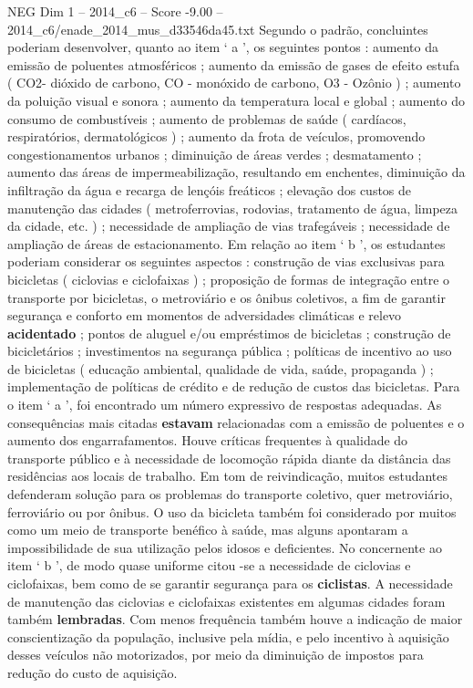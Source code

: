 \begin{textsample}{NEG Dim 1 – 2014\_c6 – Score -9.00 – 2014\_c6/enade\_2014\_mus\_d33546da45.txt}
Segundo o padrão, concluintes poderiam desenvolver, quanto ao item ‘ a ’, os seguintes pontos : aumento da emissão de poluentes atmosféricos ; aumento da emissão de gases de efeito estufa ( CO2- dióxido de carbono, CO - monóxido de carbono, O3 - Ozônio ) ; aumento da poluição visual e sonora ; aumento da temperatura local e global ; aumento do consumo de combustíveis ; aumento de problemas de saúde ( cardíacos, respiratórios, dermatológicos ) ; aumento da frota de veículos, promovendo congestionamentos urbanos ; diminuição de áreas verdes ; desmatamento ; aumento das áreas de impermeabilização, resultando em enchentes, diminuição da infiltração da água e recarga de lençóis freáticos ; elevação dos custos de manutenção das cidades ( metroferrovias, rodovias, tratamento de água, limpeza da cidade, etc. ) ; necessidade de ampliação de vias trafegáveis ; necessidade de ampliação de áreas de estacionamento.
Em relação ao item ‘ b ’, os estudantes poderiam considerar os seguintes aspectos : construção de vias exclusivas para bicicletas ( ciclovias e ciclofaixas ) ; proposição de formas de integração entre o transporte por bicicletas, o metroviário e os ônibus coletivos, a fim de garantir segurança e conforto em momentos de adversidades climáticas e relevo \textbf{acidentado} ; pontos de aluguel e/ou empréstimos de bicicletas ; construção de bicicletários ; investimentos na segurança pública ; políticas de incentivo ao uso de bicicletas ( educação ambiental, qualidade de vida, saúde, propaganda ) ; implementação de políticas de crédito e de redução de custos das bicicletas.
Para o item ‘ a ’, foi encontrado um número expressivo de respostas adequadas.
As consequências mais citadas \textbf{estavam} relacionadas com a emissão de poluentes e o aumento dos engarrafamentos.
Houve críticas frequentes à qualidade do transporte público e à necessidade de locomoção rápida diante da distância das residências aos locais de trabalho.
Em tom de reivindicação, muitos estudantes defenderam solução para os problemas do transporte coletivo, quer metroviário, ferroviário ou por ônibus.
O uso da bicicleta também foi considerado por muitos como um meio de transporte benéfico à saúde, mas alguns apontaram a impossibilidade de sua utilização pelos idosos e deficientes.
No concernente ao item ‘ b ’, de modo quase uniforme citou -se a necessidade de ciclovias e ciclofaixas, bem como de se garantir segurança para os \textbf{ciclistas}.
A necessidade de manutenção das ciclovias e ciclofaixas existentes em algumas cidades foram também \textbf{lembradas}.
Com menos frequência também houve a indicação de maior conscientização da população, inclusive pela mídia, e pelo incentivo à aquisição desses veículos não motorizados, por meio da diminuição de impostos para redução do custo de aquisição.

\end{textsample}
